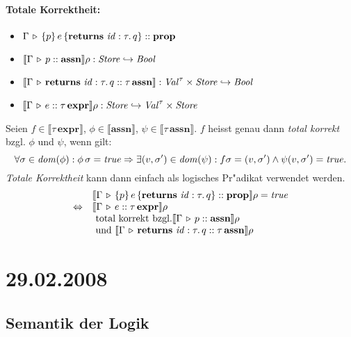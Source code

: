 \documentclass[12pt,a4paper,bigheadings]{scrartcl}
\newcommand{\semantic}[1]{\ensuremath{\llbracket#1\rrbracket}}
\newcommand{\assn}{\textbf{assn}}
\newcommand{\prop}{\textbf{prop}}
\newcommand{\expr}{\textbf{expr}}
\begin{document}
\paragraph*{Totale Korrektheit:}
\begin{itemize}
  \item $\Tj{\Gamma}{\triple{p}{e}{\ret{\id:\tau}{q}}}{\prop}$
  \item $\semantic{\Tj{\Gamma}{p}{\assn}} \rho: \Store \pto \Bool$
  \item $\semantic{\Tj{\Gamma}{\ret{\id:\tau}{q}}{\tau\,\assn}}: \Val^\tau \times \Store \pto \Bool$
  \item $\semantic{\Tj{\Gamma}{e}{\tau\,\expr}}\rho: \Store \pto \Val^\tau \times \Store$
\end{itemize}

\noindent
Seien $f\in\semantic{\tau\,\expr}$, $\phi\in\semantic{\assn}$,
$\psi\in\semantic{\tau\,\assn}$. $f$ heisst genau dann {\em total korrekt} bzgl.
$\phi$ und $\psi$, wenn gilt:
\[
  \forall \sigma\in{\text{\it dom\/}}(\phi): \phi\,\sigma = {\text{\it true\/}}
  \Rightarrow \exists (v,\sigma')\in{\text{\it dom\/}}(\psi): f\sigma = (v,\sigma') \wedge \psi(v,\sigma')={\text{\it true\/}}.
\]
{\em Totale Korrektheit} kann dann einfach als logisches Pr"adikat verwendet
werden.
\[\begin{array}{rl}
  & \semantic{\Tj{\Gamma}{\triple{p}{e}{\ret{\id:\tau}{q}}}{\prop}}\rho = \true
    \\
  \Leftrightarrow & \semantic{\Tj{\Gamma}{e}{\tau\,\expr}}\rho \\
  & \text{ total korrekt bzgl.} 
    \semantic{\Tj{\Gamma}{p}{\assn}}\rho \\
  & \text{ und } \semantic{\Tj{\Gamma}{\ret{\id:\tau}{q}}{\tau\,\assn}}\rho
\end{array}\]


\section*{29.02.2008}

\subsection*{Semantik der Logik}
\end{document}
